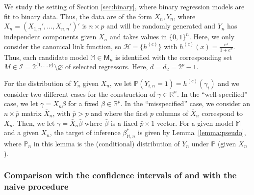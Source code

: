 \documentclass[preprint]{imsart}
\newcommand{\R}{{\mathbb R}}
\renewcommand{\P}{{\mathbb P}}
\newcommand{\M}{\mathbb M}
\numberwithin{equation}{section}
\begin{document}
We study the setting of Section \ref{sec:binary}, where binary regression models are fit to binary data. Thus, the data are of the form $X_n, Y_n$, where $X_n = (X_{1,n}',...,X_{n,n}')'$ is $n \times p$ and will be randomly generated and $Y_n$ has independent components given $X_n$ and takes values in $\{0,1\}^n$. Here, we only consider the canonical link function, so $\mathcal H = \{h^{(c)}\}$ with $h^{(c)}(x) = \frac{e^x}{1+e^x}$. Thus, each candidate model $\M\in\mathsf M_n$ is identified with the corresponding set $M\in\mathcal I= 2^{\{1,\dots, p\}}\setminus\varnothing$ of selected regressors. Here, $d=d_2 = 2^p-1$.

For the distribution of $Y_n$ given $X_n$, we let $\P( Y_{i,n} = 1 ) = h^{(c)}(\gamma_i)$ and we consider two different cases for the construction of $\gamma\in\R^n$. In the ``well-specified'' case, we let $\gamma = X_n \beta$ for a fixed $\beta \in \mathbb{R}^p$. In the ``misspecified'' case, we consider an $n \times \bar{p}$ matrix $\bar{X}_n$, with $\bar{p} > p$ and where the first $p$ columns of $\bar{X}_n$ correspond to $X_n$. Then, we let $\gamma = \bar {X}_n \bar{\beta}$ where $\bar{\beta}$ is a fixed $\bar{p} \times 1$ vector. 
For a given model $\mathbb{M}$ and a given $X_n$, the target of inference $\beta_{\M,n}^*$ is given by Lemma~\ref{lemma:pseudo}, where $\mathbb{P}_n $ in this lemma is the (conditional) distribution of $Y_n$ under $\P$ (given $X_n$).


\subsubsection{Comparison with the confidence intervals of \cite{taylor17post} and with the naive procedure}
\end{document}
